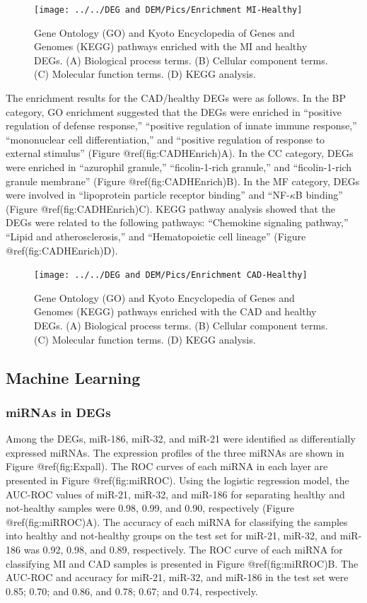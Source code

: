 \documentclass[smallextended]{svjour3}       %
\begin{document}
\begin{figure}
\texttt{[image: ../../DEG and DEM/Pics/Enrichment MI-Healthy]} \caption{Gene Ontology (GO) and Kyoto Encyclopedia of Genes and Genomes (KEGG) pathways enriched with the MI and healthy DEGs. (A) Biological process terms. (B) Cellular component terms. (C) Molecular function terms. (D) KEGG analysis.}\label{fig:MIHEnrich}
\end{figure}

The enrichment results for the CAD/healthy DEGs were as follows. In the
BP category, GO enrichment suggested that the DEGs were enriched in
``positive regulation of defense response,'' ``positive regulation of
innate immune response,'' ``mononuclear cell differentiation,'' and
``positive regulation of response to external stimulus'' (Figure
@ref(fig:CADHEnrich)A). In the CC category, DEGs were enriched in
``azurophil granule,'' ``ficolin-1-rich granule,'' and ``ficolin-1-rich
granule membrane'' (Figure @ref(fig:CADHEnrich)B). In the MF category,
DEGs were involved in ``lipoprotein particle receptor binding'' and
``NF-\(\kappa\)B binding'' (Figure @ref(fig:CADHEnrich)C). KEGG pathway
analysis showed that the DEGs were related to the following pathways:
``Chemokine signaling pathway,'' ``Lipid and atherosclerosis,'' and
``Hematopoietic cell lineage'' (Figure @ref(fig:CADHEnrich)D).

\begin{figure}
\texttt{[image: ../../DEG and DEM/Pics/Enrichment CAD-Healthy]} \caption{Gene Ontology (GO) and Kyoto Encyclopedia of Genes and Genomes (KEGG) pathways enriched with the CAD and healthy DEGs. (A) Biological process terms. (B) Cellular component terms. (C) Molecular function terms. (D) KEGG analysis.}\label{fig:CADHEnrich}
\end{figure}

\hypertarget{machine-learning}{%
\subsection{Machine Learning}\label{machine-learning}}

\hypertarget{mirnas-in-degs-1}{%
\subsubsection{miRNAs in DEGs}\label{mirnas-in-degs-1}}

Among the DEGs, miR-186, miR-32, and miR-21 were identified as
differentially expressed miRNAs. The expression profiles of the three
miRNAs are shown in Figure @ref(fig:Expall). The ROC curves of each
miRNA in each layer are presented in Figure @ref(fig:miRROC). Using the
logistic regression model, the AUC-ROC values of miR-21, miR-32, and
miR-186 for separating healthy and not-healthy samples were 0.98, 0.99,
and 0.90, respectively (Figure @ref(fig:miRROC)A). The accuracy of each
miRNA for classifying the samples into healthy and not-healthy groups on
the test set for miR-21, miR-32, and miR-186 was 0.92, 0.98, and 0.89,
respectively. The ROC curve of each miRNA for classifying MI and CAD
samples is presented in Figure @ref(fig:miRROC)B. The AUC-ROC and
accuracy for miR-21, miR-32, and miR-186 in the test set were 0.85;
0.70; and 0.86, and 0.78; 0.67; and 0.74, respectively.
\end{document}
